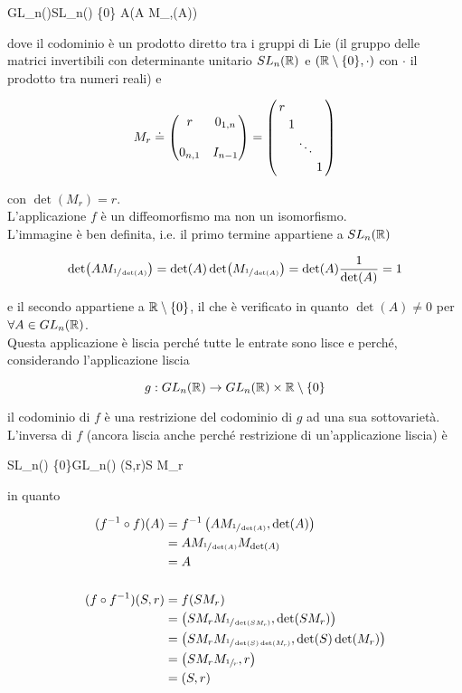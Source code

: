 %
	{GL_{n}(\R)}{SL_{n}(\R) \times \R \setminus \{0\}}%
	{A}{(A M_{},\det(A))}

dove il codominio è un prodotto diretto tra i gruppi di Lie (il gruppo delle matrici invertibili con determinante unitario $ SL_{n}(\mathbb{R}) $ e $ (\mathbb{R} \setminus \{0\},\cdot) $ con $ \cdot $ il prodotto tra numeri reali) e

\begin{equation}
	M_{r} \doteq %
	\mqty( r & 0_{1,n} \\\\ 0_{n,1} & I_{n-1} ) = %
	\smqty(\dmat{ r, 1, \ddots, 1 })
\end{equation}

con $ \det(M_{r}) = r $.\\
L'applicazione $ f $ è un diffeomorfismo ma non un isomorfismo.\\
L'immagine è ben definita, i.e. il primo termine appartiene a $ SL_{n}(\mathbb{R}) $

\begin{equation}
	\det(A M_{\sfrac{1}{\det(A)}}) = \det(A) \det(M_{\sfrac{1}{\det(A)}}) = \det(A) \dfrac{1}{\det(A)} = 1
\end{equation}

e il secondo appartiene a $ \mathbb{R} \setminus \{0\} $, il che è verificato in quanto $ \det(A) \neq 0 $ per $ \forall A \in GL_{n}(\mathbb{R}) $.\\
Questa applicazione è liscia perché tutte le entrate sono lisce e perché, considerando l'applicazione liscia

\begin{equation}
	g : GL_{n}(\mathbb{R}) \to GL_{n}(\mathbb{R}) \times \mathbb{R} \setminus \{0\}
\end{equation}
 
il codominio di $ f $ è una restrizione del codominio di $ g $ ad una sua sottovarietà.\\
L'inversa di $ f $ (ancora liscia anche perché restrizione di un'applicazione liscia) è

%
	{SL_{n}(\R) \times \R \setminus \{0\}}{GL_{n}(\R)}%
	{(S,r)}{S M_{r}}

in quanto

\begin{align}
	\begin{split}
		(f^{-1} \circ f)(A) &= f^{-1} \left( A M_{\sfrac{1}{\det(A)}},\det(A) \right)\\
		&= A M_{\sfrac{1}{\det(A)}} M_{\det(A)}\\
		&= A\\\\
		(f \circ f^{-1})(S,r) &= f(S M_{r})\\
		&= \left( S M_{r} M_{\sfrac{1}{\det(S M_{r})}},\det(S M_{r}) \right)\\
		&= \left( S M_{r} M_{\sfrac{1}{\det(S) \det(M_{r})}},\det(S) \det(M_{r}) \right)\\
		&= \left( S M_{r} M_{\sfrac{1}{r}},r \right)\\
		&= (S,r)
	\end{split}
\end{align}

